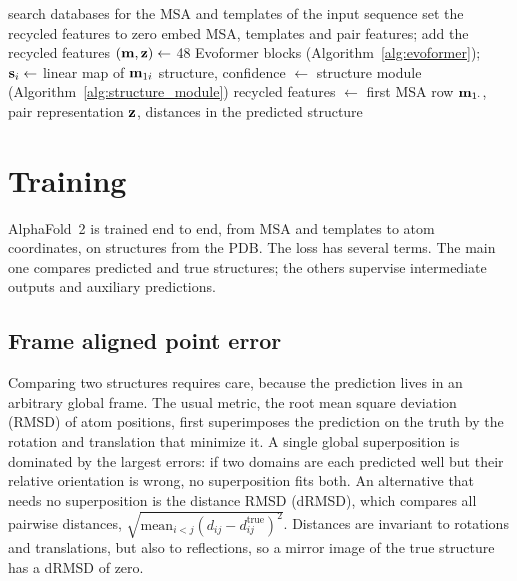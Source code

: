 \begin{algorithm}[!htbp]
  \caption{AlphaFold~2 inference with recycling.}
  \label{alg:recycling}
  \begin{algorithmic}[1]
    \State search databases for the MSA and templates of the input sequence
    \State set the recycled features to zero
     
      \State embed MSA, templates and pair features; add the recycled features
      \State $(\mathbf{m},\mathbf{z})\gets$ 48 Evoformer blocks (Algorithm~\ref{alg:evoformer}); $\mathbf{s}_i\gets$ linear map of $\mathbf{m}_{1i}$
      \State structure, confidence $\gets$ structure module (Algorithm~\ref{alg:structure_module})
      \State recycled features $\gets$ first MSA row $\mathbf{m}_{1\cdot}$, pair representation $\mathbf{z}$, distances in the predicted structure
    \EndFor
  \end{algorithmic}
\end{algorithm}

\section{Training}
\label{sec:training}

AlphaFold~2 is trained end to end, from MSA and templates to atom coordinates, on structures from the PDB. The loss has several terms. The main one compares predicted and true structures; the others supervise intermediate outputs and auxiliary predictions.

\subsection{Frame aligned point error}

Comparing two structures requires care, because the prediction lives in an arbitrary global frame. The usual metric, the root mean square deviation (RMSD) of atom positions, first superimposes the prediction on the truth by the rotation and translation that minimize it. A single global superposition is dominated by the largest errors: if two domains are each predicted well but their relative orientation is wrong, no superposition fits both. An alternative that needs no superposition is the distance RMSD (dRMSD), which compares all pairwise distances, $\sqrt{\text{mean}_{i<j}(d_{ij}-d^{\text{true}}_{ij})^2}$. Distances are invariant to rotations and translations, but also to reflections, so a mirror image of the true structure has a dRMSD of zero.

